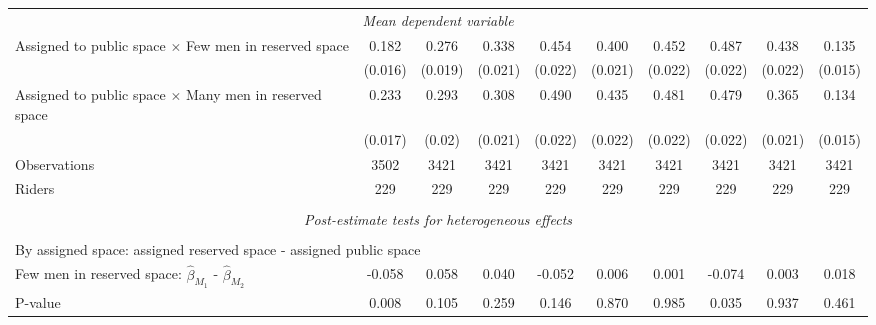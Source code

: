 \begin{tabular}{l*{9}{c}}
\multicolumn{10}{c}{\textit{Mean dependent variable}} \\ Assigned to public space $\times$ Few men in reserved space&       0.182         &       0.276         &       0.338         &       0.454         &       0.400         &       0.452         &       0.487         &       0.438         &       0.135         \\
\,                  &     (0.016)         &     (0.019)         &     (0.021)         &     (0.022)         &     (0.021)         &     (0.022)         &     (0.022)         &     (0.022)         &     (0.015)         \\
Assigned to public space $\times$ Many men in reserved space&       0.233         &       0.293         &       0.308         &       0.490         &       0.435         &       0.481         &       0.479         &       0.365         &       0.134         \\
\,                  &     (0.017)         &      (0.02)         &     (0.021)         &     (0.022)         &     (0.022)         &     (0.022)         &     (0.022)         &     (0.021)         &     (0.015)         \\
Observations        &        3502         &        3421         &        3421         &        3421         &        3421         &        3421         &        3421         &        3421         &        3421         \\
Riders              &         229         &         229         &         229         &         229         &         229         &         229         &         229         &         229         &         229         \\
\hline \\[-1ex]  \multicolumn{10}{c}{\textit{Post-estimate tests for heterogeneous effects}} \\\\[-1ex] \multicolumn{10}{l}{By assigned space: assigned reserved space - assigned public space} \\ \quad Few men in reserved space: $\hat\beta_{M_1}$ - $\hat\beta_{M_2}$&      -0.058         &       0.058         &       0.040         &      -0.052         &       0.006         &       0.001         &      -0.074         &       0.003         &       0.018         \\
\quad P-value       &       0.008         &       0.105         &       0.259         &       0.146         &       0.870         &       0.985         &       0.035         &       0.937         &       0.461         \\

\end{tabular}
